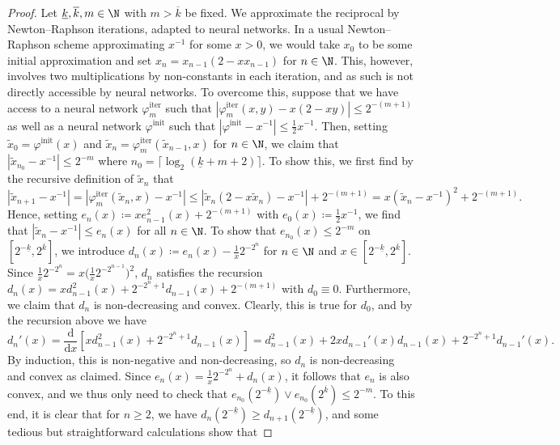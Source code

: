 \documentclass[a4paper, 11pt, headings = small, abstract]{scrartcl}
\begin{document}
\begin{proof}
    Let $\underline{k}, \overline{k}, m\in\N$ with $m>\overline{k}$ be fixed.
    We approximate the reciprocal by Newton--Raphson iterations, adapted to neural networks.
    In a usual Newton--Raphson scheme approximating $x^{-1}$ for some $x>0$, we would take $x_0$ to be some initial approximation and set $x_n=x_{n-1}(2-xx_{n-1})$ for $n\in\N$.
    This, however, involves two multiplications by non-constants in each iteration, and as such is not directly accessible by neural networks.
    To overcome this, suppose that we have access to a neural network $\varphi_m^{\mathrm{iter}}$ such that $|\varphi_{m}^{\mathrm{iter}}(x, y)-x(2-xy)|\le2^{-(m+1)}$ as well as a neural network $\varphi^{\mathrm{init}}$ such that $|\varphi^{\mathrm{init}}-x^{-1}|\le\frac{1}{2}x^{-1}$.
    Then, setting $\widetilde{x}_0=\varphi^{\mathrm{init}}(x)$ and $\widetilde{x}_{n}=\varphi^{\mathrm{iter}}_m(\widetilde{x}_{n-1}, x)$ for $n\in\N$, we claim that $|\widetilde{x}_{n_0}-x^{-1}|\le 2^{-m}$ where $n_0=\lceil\log_2(\underline{k}+m+2)\rceil$.
    To show this, we first find by the recursive definition of $\widetilde{x}_n$ that
    \[
        |\widetilde{x}_{n+1}-x^{-1}|
        =|\varphi_m^{\mathrm{iter}}(\widetilde{x}_n, x)-x^{-1}|
        \le|\widetilde{x}_n(2-x\widetilde{x}_n)-x^{-1}|+2^{-(m+1)}
        =x(\widetilde{x}_n-x^{-1})^2+2^{-(m+1)}.
    \]
    Hence, setting $e_n(x)\coloneqq xe_{n-1}^2(x)+2^{-(m+1)}$ with $e_0(x)\coloneqq\frac{1}{2}x^{-1}$, we find that $|\widetilde{x}_n-x^{-1}|\le e_n(x)$ for all $n\in\N$.
    To show that $e_{n_0}(x)\le 2^{-m}$ on $[2^{-\underline{k}}, 2^{\overline{k}}]$, we introduce $d_n(x)\coloneqq e_n(x)-\frac{1}{x}2^{-2^n}$ for $n\in\N$ and $x\in[2^{-\underline{k}}, 2^{\overline{k}}]$. Since $\frac{1}{x}2^{-2^n}=x\big(\frac{1}{x}2^{-2^{n-1}}\big)^2$, $d_n$ satisfies the recursion $d_n(x)=xd_{n-1}^2(x)+2^{-2^n+1}d_{n-1}(x)+2^{-(m+1)}$ with $d_0\equiv0$.
    Furthermore, we claim that $d_n$ is non-decreasing and convex.
    Clearly, this is true for $d_0$, and by the recursion above we have
    \[
        d_n'(x)
        =\frac{\mathrm{d}}{\mathrm{d}x}[x d_{n-1}^{2}(x)+2^{-2^n+1}d_{n-1}(x)]
        =d_{n-1}^2(x)+2xd_{n-1}'(x)d_{n-1}(x)+2^{-2^n+1}d_{n-1}'(x).
    \]
    By induction, this is non-negative and non-decreasing, so $d_n$ is non-decreasing and convex as claimed.
    Since $e_n(x)=\frac{1}{x}2^{-2^n}+d_n(x)$, it follows that $e_n$ is also convex, and we thus only need to check that $e_{n_0}(2^{-\underline{k}})\vee e_{n_0}(2^{\overline{k}})\le 2^{-m}$.
    To this end, it is clear that for $n\ge2$, we have $d_n(2^{-\underline{k}})\ge d_{n+1}(2^{-\underline{k}})$, and some tedious but straightforward calculations show that

\end{proof}
\end{document}
